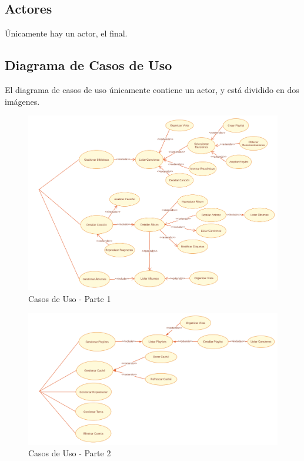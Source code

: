 \subsection{Actores}
Únicamente hay un actor, el  final. 

\subsection{Diagrama de Casos de Uso}
El diagrama de casos de uso únicamente contiene un actor, y está dividido en dos imágenes.

\begin{figure}[H]
    \begin{center}
        \includegraphics[]{img/B/CU_1.png}
        \caption{Casos de Uso - Parte 1}
        \label{fig:CU_1}
    \end{center}

\end{figure}

\begin{figure}[H]
    \begin{center}
        \includegraphics[]{img/B/CU_2.png}
        \caption{Casos de Uso - Parte 2}
        \label{fig:CU_2}
    \end{center}

\end{figure}
\clearpage


